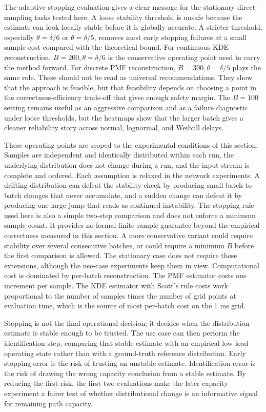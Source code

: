 \documentclass[a4paper,11pt]{report}
\begin{document}
The adaptive stopping evaluation gives a clear message for the stationary direct-sampling tasks tested here. A loose stability threshold is unsafe because the estimate can look locally stable before it is globally accurate. A stricter threshold, especially \(\theta=\delta/6\) or \(\theta=\delta/5\), removes most early stopping failures at a small sample cost compared with the theoretical bound. For continuous KDE reconstruction, \(B=200,\theta=\delta/6\) is the conservative operating point used to carry the method forward. For discrete PMF reconstruction, \(B=300,\theta=\delta/5\) plays the same role. These should not be read as universal recommendations. They show that the approach is feasible, but that feasibility depends on choosing a point in the correctness-efficiency trade-off that gives enough safety margin. The \(B=100\) setting remains useful as an aggressive comparison and as a failure diagnostic under loose thresholds, but the heatmaps show that the larger batch gives a cleaner reliability story across normal, lognormal, and Weibull delays.

These operating points are scoped to the experimental conditions of this section. Samples are independent and identically distributed within each run, the underlying distribution does not change during a run, and the input stream is complete and ordered. Each assumption is relaxed in the network experiments. A drifting distribution can defeat the stability check by producing small batch-to-batch changes that never accumulate, and a sudden change can defeat it by producing one large jump that reads as continued instability. The stopping rule used here is also a simple two-step comparison and does not enforce a minimum sample count. It provides no formal finite-sample guarantee beyond the empirical correctness measured in this section. A more conservative variant could require stability over several consecutive batches, or could require a minimum \(B\) before the first comparison is allowed. The stationary case does not require these extensions, although the use-case experiments keep them in view. Computational cost is dominated by per-batch reconstruction. The PMF estimator costs one increment per sample. The KDE estimator with Scott's rule costs work proportional to the number of samples times the number of grid points at evaluation time, which is the source of most per-batch cost on the 1 ms grid.

Stopping is not the final operational decision; it decides when the distribution estimate is stable enough to be trusted. The use case can then perform the identification step, comparing that stable estimate with an empirical low-load operating state rather than with a ground-truth reference distribution. Early stopping error is the risk of trusting an unstable estimate. Identification error is the risk of drawing the wrong capacity conclusion from a stable estimate. By reducing the first risk, the first two evaluations make the later capacity experiment a fairer test of whether distributional change is an informative signal for remaining path capacity.
\end{document}

